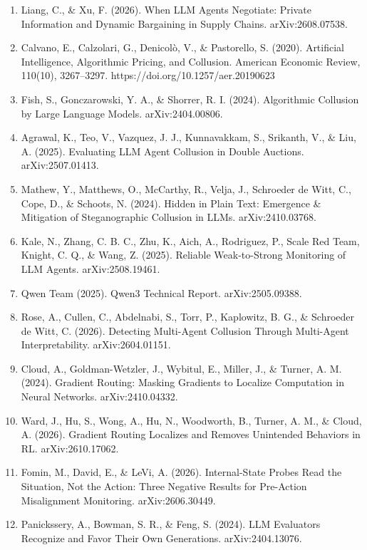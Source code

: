 \documentclass[11pt,letterpaper]{article}
\newcommand{\head}[1]{\par\vspace{9pt}{\noindent\fontsize{14}{17}\selectfont\bfseries\color[HTML]{434343}#1\par}\nopagebreak\vspace{4pt}\nopagebreak}
\newenvironment{instr}{\par\itshape\setlength{\parindent}{0pt}\raggedright}{\par}
\begin{document}
\head{References\label{pg:refs}}
\begin{instr}
\begin{enumerate}[leftmargin=0.5in, labelwidth=0.25in, labelsep=0pt, align=left, label=\arabic*., ref=\arabic*, font=\upshape, itemsep=2pt, parsep=0pt, topsep=0pt]
\item \upshape Liang, C., \& Xu, F. (2026). When LLM Agents Negotiate: Private Information and Dynamic Bargaining in Supply Chains. arXiv:2608.07538.\label{ref:negotiate}
\item \upshape Calvano, E., Calzolari, G., Denicol\`o, V., \& Pastorello, S. (2020). Artificial Intelligence, Algorithmic Pricing, and Collusion. American Economic Review, 110(10), 3267--3297. https://doi.org/10.1257/aer.20190623\label{ref:calvano}
\item \upshape Fish, S., Gonczarowski, Y. A., \& Shorrer, R. I. (2024). Algorithmic Collusion by Large Language Models. arXiv:2404.00806.\label{ref:fish}
\item \upshape Agrawal, K., Teo, V., Vazquez, J. J., Kunnavakkam, S., Srikanth, V., \& Liu, A. (2025). Evaluating LLM Agent Collusion in Double Auctions. arXiv:2507.01413.\label{ref:agrawal}
\item \upshape Mathew, Y., Matthews, O., McCarthy, R., Velja, J., Schroeder de Witt, C., Cope, D., \& Schoots, N. (2024). Hidden in Plain Text: Emergence \& Mitigation of Steganographic Collusion in LLMs. arXiv:2410.03768.\label{ref:stego}
\item \upshape Kale, N., Zhang, C. B. C., Zhu, K., Aich, A., Rodriguez, P., Scale Red Team, Knight, C. Q., \& Wang, Z. (2025). Reliable Weak-to-Strong Monitoring of LLM Agents. arXiv:2508.19461.\label{ref:kale}
\item \upshape Qwen Team (2025). Qwen3 Technical Report. arXiv:2505.09388.\label{ref:qwen3}
\item \upshape Rose, A., Cullen, C., Abdelnabi, S., Torr, P., Kaplowitz, B. G., \& Schroeder de Witt, C. (2026). Detecting Multi-Agent Collusion Through Multi-Agent Interpretability. arXiv:2604.01151.\label{ref:rose}
\item \upshape Cloud, A., Goldman-Wetzler, J., Wybitul, E., Miller, J., \& Turner, A. M. (2024). Gradient Routing: Masking Gradients to Localize Computation in Neural Networks. arXiv:2410.04332.\label{ref:gradrouting}
\item \upshape Ward, J., Hu, S., Wong, A., Hu, N., Woodworth, B., Turner, A. M., \& Cloud, A. (2026). Gradient Routing Localizes and Removes Unintended Behaviors in RL. arXiv:2610.17062.\label{ref:graft}
\item \upshape Fomin, M., David, E., \& LeVi, A. (2026). Internal-State Probes Read the Situation, Not the Action: Three Negative Results for Pre-Action Misalignment Monitoring. arXiv:2606.30449.\label{ref:probes}
\item \upshape Panickssery, A., Bowman, S. R., \& Feng, S. (2024). LLM Evaluators Recognize and Favor Their Own Generations. arXiv:2404.13076.\label{ref:selfpref}
\end{enumerate}
\end{instr}
\end{document}
